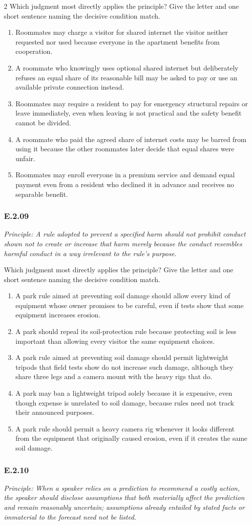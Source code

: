 \documentclass[10pt]{extarticle}
\newcommand{\choice}[1]{\item #1}
\newcommand{\bankitem}[1]{\subsubsection*{#1}}
\begin{document}
\begin{multicols}{2}
Which judgment most directly applies the principle? Give the letter and one short sentence naming the decisive condition match.
\begin{enumerate}[label=(\alph*)]
  \choice{Roommates may charge a visitor for shared internet the visitor neither requested nor used because everyone in the apartment benefits from cooperation.}
  \choice{A roommate who knowingly uses optional shared internet but deliberately refuses an equal share of its reasonable bill may be asked to pay or use an available private connection instead.}
  \choice{Roommates may require a resident to pay for emergency structural repairs or leave immediately, even when leaving is not practical and the safety benefit cannot be divided.}
  \choice{A roommate who paid the agreed share of internet costs may be barred from using it because the other roommates later decide that equal shares were unfair.}
  \choice{Roommates may enroll everyone in a premium service and demand equal payment even from a resident who declined it in advance and receives no separable benefit.}
\end{enumerate}
\bankitem{E.2.09}
\emph{Principle: A rule adopted to prevent a specified harm should not prohibit conduct shown not to create or increase that harm merely because the conduct resembles harmful conduct in a way irrelevant to the rule's purpose.}

Which judgment most directly applies the principle? Give the letter and one short sentence naming the decisive condition match.
\begin{enumerate}[label=(\alph*)]
  \choice{A park rule aimed at preventing soil damage should allow every kind of equipment whose owner promises to be careful, even if tests show that some equipment increases erosion.}
  \choice{A park should repeal its soil-protection rule because protecting soil is less important than allowing every visitor the same equipment choices.}
  \choice{A park rule aimed at preventing soil damage should permit lightweight tripods that field tests show do not increase such damage, although they share three legs and a camera mount with the heavy rigs that do.}
  \choice{A park may ban a lightweight tripod solely because it is expensive, even though expense is unrelated to soil damage, because rules need not track their announced purposes.}
  \choice{A park rule should permit a heavy camera rig whenever it looks different from the equipment that originally caused erosion, even if it creates the same soil damage.}
\end{enumerate}
\bankitem{E.2.10}
\emph{Principle: When a speaker relies on a prediction to recommend a costly action, the speaker should disclose assumptions that both materially affect the prediction and remain reasonably uncertain; assumptions already entailed by stated facts or immaterial to the forecast need not be listed.}


\end{multicols}
\end{document}

